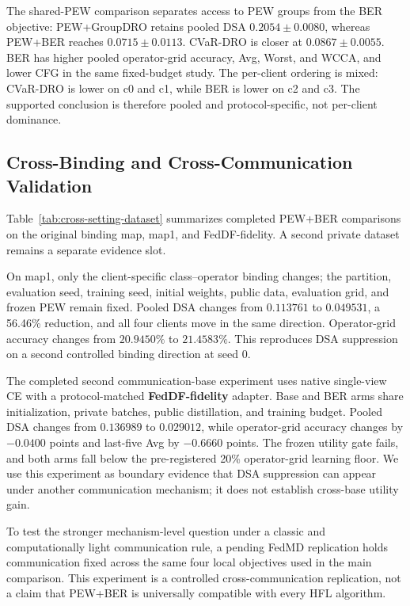 The shared-PEW comparison separates access to PEW groups from the BER objective: PEW+GroupDRO retains pooled DSA \(0.2054\pm0.0080\), whereas PEW+BER reaches \(0.0715\pm0.0113\). CVaR-DRO is closer at \(0.0867\pm0.0055\). BER has higher pooled operator-grid accuracy, Avg, Worst, and WCCA, and lower CFG in the same fixed-budget study. The per-client ordering is mixed: CVaR-DRO is lower on c0 and c1, while BER is lower on c2 and c3. The supported conclusion is therefore pooled and protocol-specific, not per-client dominance.

\subsection{Cross-Binding and Cross-Communication Validation}

Table~\ref{tab:cross-setting-dataset} summarizes completed PEW+BER comparisons on the original binding map, map1, and FedDF-fidelity. A second private dataset remains a separate evidence slot.



On map1, only the client-specific class--operator binding changes; the partition, evaluation seed, training seed, initial weights, public data, evaluation grid, and frozen PEW remain fixed. Pooled DSA changes from \(0.113761\) to \(0.049531\), a 56.46\% reduction, and all four clients move in the same direction. Operator-grid accuracy changes from \(20.9450\%\) to \(21.4583\%\). This reproduces DSA suppression on a second controlled binding direction at seed 0.

The completed second communication-base experiment uses native single-view CE with a protocol-matched \textbf{FedDF-fidelity} adapter. Base and BER arms share initialization, private batches, public distillation, and training budget. Pooled DSA changes from \(0.136989\) to \(0.029012\), while operator-grid accuracy changes by \(-0.0400\) points and last-five Avg by \(-0.6660\) points. The frozen utility gate fails, and both arms fall below the pre-registered 20\% operator-grid learning floor. We use this experiment as boundary evidence that DSA suppression can appear under another communication mechanism; it does not establish cross-base utility gain.

To test the stronger mechanism-level question under a classic and computationally light communication rule, a pending FedMD replication holds communication fixed across the same four local objectives used in the main comparison. This experiment is a controlled cross-communication replication, not a claim that PEW+BER is universally compatible with every HFL algorithm.

